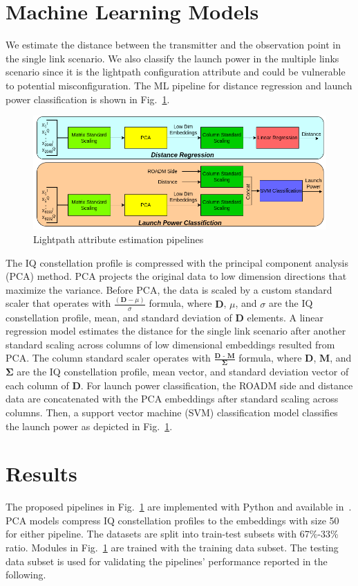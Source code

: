 \documentclass[lettersize,journal, one-column]{IEEEtran}
\begin{document}
\section{Machine Learning Models}
\label{section:ml_models}
We estimate the distance between the transmitter and the observation point in the single link scenario.
We also classify the launch power in the multiple links scenario since it is the lightpath configuration attribute and could be vulnerable to potential misconfiguration.
The ML pipeline for distance regression and launch power classification is shown in Fig.~\ref{figure:models}.
\begin{figure}
	\centering
    \includegraphics[width=\columnwidth]{figures/models.png}
    \caption{Lightpath attribute estimation pipelines}
	\label{figure:models}
\end{figure}
The IQ constellation profile is compressed with the principal component analysis (PCA) method.
PCA projects the original data to low dimension directions that maximize the variance.
Before PCA, the data is scaled by a custom standard scaler that operates with $\frac{(\textbf{D}-\mu)}{\sigma}$ formula, where $\textbf{D}$, $\mu$, and $\sigma$ are the IQ constellation profile, mean, and standard deviation of $\textbf{D}$ elements.
A linear regression model estimates the distance for the single link scenario after another standard scaling across columns of low dimensional embeddings resulted from PCA.
The column standard scaler operates with $\frac{\textbf{D - M}}{\mathbf{\Sigma}}$ formula, where $\textbf{D}$, $\textbf{M}$, and $\mathbf{\Sigma}$ are the IQ constellation profile, mean vector, and standard deviation vector of each column of $\textbf{D}$.
For launch power classification, the ROADM side and distance data are concatenated with the PCA embeddings after standard scaling across columns.
Then, a support vector machine (SVM) classification model classifies the launch power as depicted in Fig.~\ref{figure:models}.

\section{Results}
\label{section:results}
The proposed pipelines in Fig.~\ref{figure:models} are implemented with Python and available in~\cite{code}.
PCA models compress IQ constellation profiles to the embeddings with size 50 for either pipeline.
The datasets are split into train-test subsets with 67\%-33\% ratio.
Modules in Fig.~\ref{figure:models} are trained with the training data subset.
The testing data subset is used for validating the pipelines' performance reported in the following.
\end{document}
